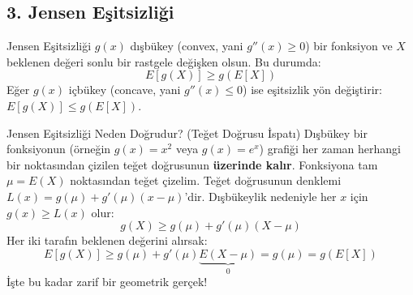 \documentclass[12pt,a4paper]{article}
\begin{document}
\begin{center}
\end{center}

\subsection{3. Jensen Eşitsizliği}
\begin{teorem}{Jensen Eşitsizliği}
$g(x)$ dışbükey (convex, yani $g''(x) \ge 0$) bir fonksiyon ve $X$ beklenen değeri sonlu bir rastgele değişken olsun. Bu durumda:
\begin{equation}
    E[g(X)] \ge g(E[X])
\end{equation}
Eğer $g(x)$ içbükey (concave, yani $g''(x) \le 0$) ise eşitsizlik yön değiştirir: $E[g(X)] \le g(E[X])$.
\end{teorem}

\begin{sezgi}{Jensen Eşitsizliği Neden Doğrudur? (Teğet Doğrusu İspatı)}
Dışbükey bir fonksiyonun (örneğin $g(x) = x^2$ veya $g(x) = e^x$) grafiği her zaman herhangi bir noktasından çizilen teğet doğrusunun \textbf{üzerinde kalır}.  
Fonksiyona tam $\mu = E(X)$ noktasından teğet çizelim. Teğet doğrusunun denklemi $L(x) = g(\mu) + g'(\mu)(x - \mu)$'dir.  
Dışbükeylik nedeniyle her $x$ için $g(x) \ge L(x)$ olur:
\begin{equation}
    g(X) \ge g(\mu) + g'(\mu)(X - \mu)
\end{equation}
Her iki tarafın beklenen değerini alırsak:
\begin{equation}
    E[g(X)] \ge g(\mu) + g'(\mu) \underbrace{E(X - \mu)}_{0} = g(\mu) = g(E[X])
\end{equation}
İşte bu kadar zarif bir geometrik gerçek!
\end{sezgi}
\end{document}
